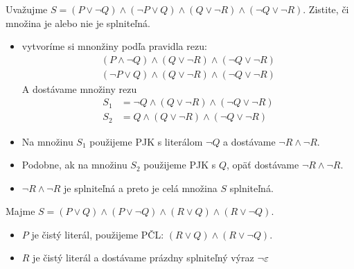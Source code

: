 \begin{priklad}
    Uvažujme $S=(P \lor \neg Q) \land (\neg P \lor Q) \land 
                (Q \lor \neg R) \land (\neg Q \lor \neg R)$.
    Zistite, či množina je alebo nie je splniteľná.

    \begin{itemize}
    \item vytvoríme si mnonžiny podľa pravidla rezu:
        \begin{align*}
            (P\land \neg Q) \land (Q \lor \neg R)  \land 
            (\neg Q \lor \neg R) \\
            (\neg P \lor Q) \land (Q \lor \neg R) \land 
            (\neg Q \lor \neg R)
        \end{align*}
        A dostávame množiny rezu
        \begin{align*}
            S_1 &= \neg Q \land (Q \lor \neg R) \land 
                (\neg Q \lor \neg R)\\
            S_2 &= Q \land (Q \lor \neg R) \land 
                (\neg Q \lor \neg R)
        \end{align*}

    \item Na množinu $S_1$ použijeme PJK s literálom $\neg Q$ a
        dostávame $\neg R \land \neg R$.
    \item Podobne, ak na množinu $S_2$ použijeme PJK s $Q$, opäť
        dostávame $\neg R \land \neg R$.
    \item $\neg R \land \neg R$ je splniteľná a preto je celá
        množina $S$ splniteľná.
    \end{itemize}
\end{priklad}

\begin{priklad}
    Majme $S=(P \lor Q) \land (P \lor \neg Q) \land 
        (R \lor Q) \land (R \lor \neg Q)$. 
    
    \begin{itemize}
    \item $P$ je čistý literál, použijeme PČL:
        $(R \lor Q) \land (R \lor \neg Q)$.
    \item $R$ je čistý literál a dostávame prázdny splniteľný výraz 
        $\neg \varepsilon$
    \end{itemize}
\end{priklad}

